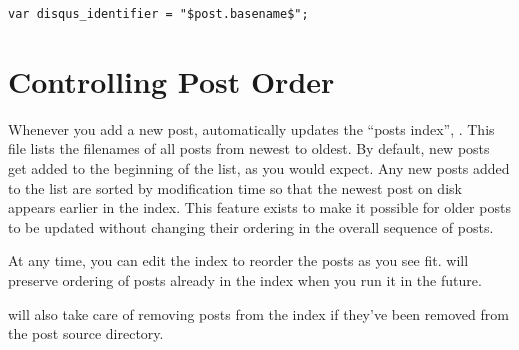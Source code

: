 \documentclass[11pt, letterpaper, oneside, titlepage]{book}
\begin{document}
\begin{verbatim}
var disqus_identifier = "$post.basename$";
\end{verbatim}

\section{Controlling Post Order}
\label{sec:postsindex}

Whenever you add a new post,  automatically updates the ``posts
index'', .  This file lists the
filenames of all posts from newest to oldest.  By default, new posts
get added to the beginning of the list, as you would expect.  Any new
posts added to the list are sorted by modification time so that the
newest post on disk appears earlier in the index.  This feature exists
to make it possible for older posts to be updated without changing
their ordering in the overall sequence of posts.

At any time, you can edit the index to reorder the posts as you see
fit.   will preserve ordering of posts already in the index
when you run it in the future.

 will also take care of removing posts from the index if
they've been removed from the post source directory.
\end{document}
